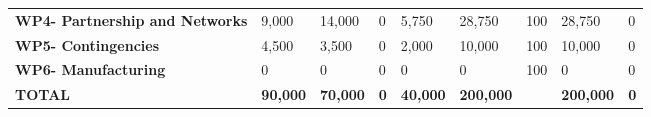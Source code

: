 \begin{landscape}
\begin{table}[H]
{\begin{tabular}{p{5cm}p{2cm}p{2cm}p{2.5cm}p{2cm}p{2cm}p{2cm}p{2cm}p{2cm}}
    \textbf{WP4- Partnership and Networks} & 9,000                                                                  & 14,000                                                             &0                                                                                 & 5,750                                                                        & 28,750                                                                                        & 100                          & 28,750                          & 0                                                                         \\
    \textbf{WP5- Contingencies}                                                        & 4,500                                                                  & 3,500                                                              &0                                                                                 & 2,000                                                                        & 10,000                                                                                        & 100                          & 10,000                          & 0                                                                         \\
    \textbf{WP6- Manufacturing}                                                        &0                                                                        &0                                                                    &0                                                                                 & 0                                                                            & 0                                                                                             & 100                          & 0                               & 0                                                                         \\ \hline
    \textbf{TOTAL}                                                                     & \textbf{90,000}                                                        & \textbf{70,000}                                                    & \textbf{0}                                                                      & \textbf{40,000}                                                              & \textbf{200,000}                                                                              & \textbf{}                    & \textbf{200,000}                & \textbf{0}                                                               
    \\ \bottomrule[2pt]
    \end{tabular} }
    \end{table}



\end{landscape}
